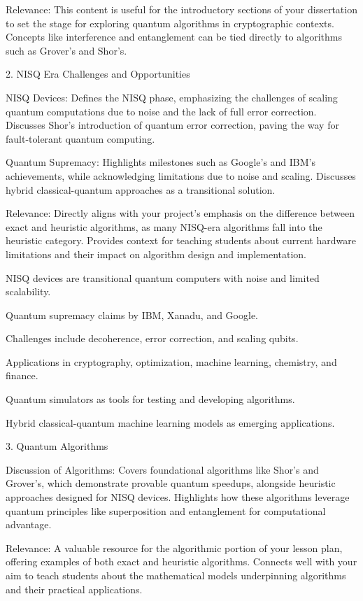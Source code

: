     Relevance:
        This content is useful for the introductory sections of your dissertation to set the stage for exploring quantum algorithms in cryptographic contexts.
        Concepts like interference and entanglement can be tied directly to algorithms such as Grover's and Shor's.

2. NISQ Era Challenges and Opportunities

    NISQ Devices:
        Defines the NISQ phase, emphasizing the challenges of scaling quantum computations due to noise and the lack of full error correction.
        Discusses Shor’s introduction of quantum error correction, paving the way for fault-tolerant quantum computing.

    Quantum Supremacy:
        Highlights milestones such as Google's and IBM's achievements, while acknowledging limitations due to noise and scaling.
        Discusses hybrid classical-quantum approaches as a transitional solution.

    Relevance:
        Directly aligns with your project's emphasis on the difference between exact and heuristic algorithms, as many NISQ-era algorithms fall into the heuristic category.
        Provides context for teaching students about current hardware limitations and their impact on algorithm design and implementation.


NISQ devices are transitional quantum computers with noise and limited scalability.

Quantum supremacy claims by IBM, Xanadu, and Google.

Challenges include decoherence, error correction, and scaling qubits.

Applications in cryptography, optimization, machine learning, chemistry, and finance.

Quantum simulators as tools for testing and developing algorithms.

Hybrid classical-quantum machine learning models as emerging applications.

3. Quantum Algorithms

    Discussion of Algorithms:
        Covers foundational algorithms like Shor’s and Grover’s, which demonstrate provable quantum speedups, alongside heuristic approaches designed for NISQ devices.
        Highlights how these algorithms leverage quantum principles like superposition and entanglement for computational advantage.

    Relevance:
        A valuable resource for the algorithmic portion of your lesson plan, offering examples of both exact and heuristic algorithms.
        Connects well with your aim to teach students about the mathematical models underpinning algorithms and their practical applications.

